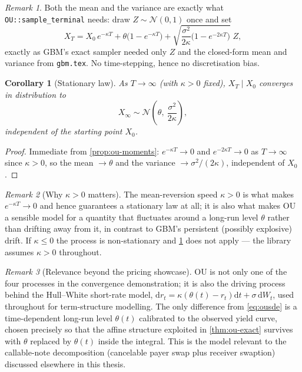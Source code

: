 \documentclass[11pt]{article}
\newcommand{\dd}{\mathrm{d}}
\newcommand{\dW}{\dd W_t}
\newcommand{\dt}{\dd t}
\theoremstyle{plain}
\newtheorem{corollary}{Corollary}
\theoremstyle{definition}
\theoremstyle{remark}
\newtheorem{remark}{Remark}
\begin{document}
\begin{remark}
Both the mean and the variance are exactly what
\texttt{OU::sample\_terminal} needs: draw $Z\sim\mathcal N(0,1)$ once
and set
\[
   X_T = X_0\,e^{-\kappa T} + \theta\big(1-e^{-\kappa T}\big)
         + \sqrt{\frac{\sigma^2}{2\kappa}\big(1-e^{-2\kappa T}\big)}\;Z,
\]
exactly as GBM's exact sampler needed only $Z$ and the closed-form mean
and variance from \texttt{gbm.tex}. No time-stepping, hence no
discretisation bias.
\end{remark}

\begin{corollary}[Stationary law]\label{cor:ou-stationary}
As $T\to\infty$ (with $\kappa>0$ fixed), $X_T\mid X_0$ converges in
distribution to
\[
   X_\infty \sim \mathcal N\!\left(\theta,\ \frac{\sigma^2}{2\kappa}\right),
\]
independent of the starting point $X_0$.
\end{corollary}

\begin{proof}
Immediate from \cref{prop:ou-moments}: $e^{-\kappa T}\to 0$ and
$e^{-2\kappa T}\to 0$ as $T\to\infty$ since $\kappa>0$, so the mean
$\to\theta$ and the variance $\to\sigma^2/(2\kappa)$, independent of
$X_0$.
\end{proof}

\begin{remark}[Why $\kappa>0$ matters]
The mean-reversion speed $\kappa>0$ is what makes $e^{-\kappa T}\to0$
and hence guarantees a stationary law at all; it is also what makes OU
a sensible model for a quantity that fluctuates around a long-run
level $\theta$ rather than drifting away from it, in contrast to GBM's
persistent (possibly explosive) drift. If $\kappa\le0$ the process is
non-stationary and \cref{cor:ou-stationary} does not apply --- the
library assumes $\kappa>0$ throughout.
\end{remark}

\begin{remark}[Relevance beyond the pricing showcase]
OU is not only one of the four processes in the convergence
demonstration; it is also the driving process behind the Hull--White
short-rate model, $\dd r_t = \kappa(\theta(t)-r_t)\dt+\sigma\,\dW$,
used throughout  for term-structure
modelling. The only difference from \eqref{eq:ousde} is a
time-dependent long-run level $\theta(t)$ calibrated to the observed
yield curve, chosen precisely so that the affine structure exploited in
\cref{thm:ou-exact} survives with $\theta$ replaced by $\theta(t)$
inside the integral. This is the model relevant to the callable-note
decomposition (cancelable payer swap plus receiver swaption) discussed
elsewhere in this thesis.
\end{remark}



\end{document}

